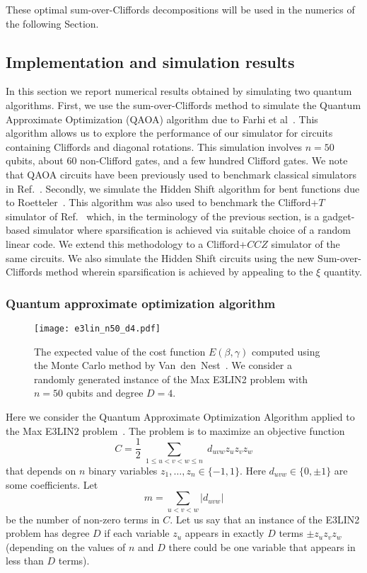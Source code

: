 These optimal sum-over-Cliffords decompositions will be used in the numerics of the following Section. 

\subsection{Implementation and simulation results}
\label{sec:numericresults}
In this section we  report numerical results obtained  by simulating two quantum algorithms.
First, we use the sum-over-Cliffords method to simulate 
the Quantum Approximate Optimization  (QAOA) algorithm due to Farhi et al~\cite{farhi2014quantum}. This algorithm allows us to explore the performance of our simulator for circuits containing Cliffords and diagonal rotations. 
This simulation involves $n=50$ qubits, about $60$ non-Clifford gates, and a few hundred Clifford gates. We note that QAOA circuits have been previously used to benchmark classical simulators in Ref.~\cite{fried2017qtorch}. Secondly, we simulate the Hidden Shift algorithm for bent functions due to  Roetteler~\cite{Roetteler09}.
This algorithm  was also used to benchmark the Clifford+$T$ simulator of
Ref.~\cite{bravyi2016improved} which, in the terminology of the previous section, is a gadget-based simulator where sparsification is achieved via suitable choice of a random linear code. We extend this methodology to a Clifford+$CCZ$ simulator of the same circuits. We also simulate the Hidden Shift circuits using the new Sum-over-Cliffords method wherein sparsification is achieved by appealing to the $\xi$ quantity.

\subsubsection{Quantum approximate optimization algorithm}
\begin{figure}[ht]
\centering
\texttt{[image: e3lin\_n50\_d4.pdf]}
\caption{The expected value of the cost function $E(\beta,\gamma)$
computed using the Monte Carlo method 
by Van~den~Nest~\cite{nest2009simulating}.
We consider a randomly generated instance of the Max E3LIN2 problem
with $n=50$ qubits and degree $D=4$.
}
\label{fig:QAOA3}
\end{figure}

Here we consider 
the Quantum Approximate Optimization Algorithm applied to the Max E3LIN2 problem~\cite{farhi2014quantum}.
The problem is to maximize  an objective function 
\[
C=\frac12 \; \sum_{1\le u<v<w\le n}\;  d_{uvw} z_u z_v z_w
\]
that depends on $n$ binary variables $z_1,\ldots,z_n\in\{-1,1\}$.
Here $d_{uvw}\in \{0,\pm 1\}$ are some coefficients. 
Let
\[
m=\sum_{u<v<w} |d_{uvw}| 
\]
be the number of non-zero terms in $C$.
Let us say that an instance of the E3LIN2 problem
has degree $D$ if each variable $z_u$
appears in exactly $D$ terms $\pm z_u z_v z_w$
(depending on the values of $n$ and $D$ there could be
one variable that appears in less than $D$ terms).



